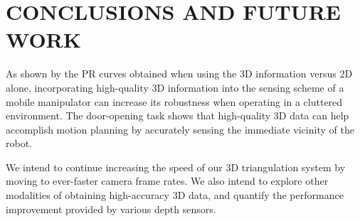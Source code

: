 \documentclass[letterpaper, 10 pt, conference]{ieeeconf}  %
\begin{document}
\newpage
\section{CONCLUSIONS AND FUTURE WORK}

As shown by the PR curves obtained when using the 3D information versus 2D
alone, incorporating high-quality 3D information into the sensing scheme of a
mobile manipulator can increase its robustness when operating in a cluttered
environment. The door-opening task shows that high-quality 3D data can help
accomplish motion planning by accurately sensing the immediate vicinity of the
robot. 

We intend to continue increasing the speed of our 3D triangulation system by
moving to ever-faster camera frame rates. We also intend to explore other 
modalities of obtaining high-accuracy 3D data, and quantify the performance
improvement provided by various depth sensors.

\end{document}
